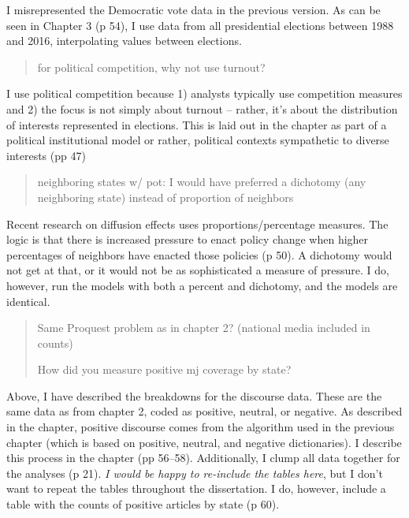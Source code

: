 \documentclass[12pt,stdletter,dateno,sigleft]{newlfm} %
\begin{document}
\begin{newlfm}
I misrepresented the Democratic vote data in the previous version. As can be seen in Chapter 3 (p 54), I use data from all presidential elections between 1988 and 2016, interpolating values between elections. 

\begin{quotation}{\color{red}\noindent \footnotesize
for political competition, why not use turnout?
}
\end{quotation}

I use political competition because 1) analysts typically use competition measures and 2) the focus is not simply about turnout -- rather, it's about the distribution of interests represented in elections. This is laid out in the chapter as part of a political institutional model or rather, political contexts sympathetic to diverse interests (pp 47) 



\begin{quotation}{\color{red}\noindent \footnotesize
neighboring states w/ pot: I would have preferred a dichotomy (any neighboring state) instead of proportion of neighbors
}
\end{quotation}

Recent research on diffusion effects uses proportions/percentage measures. The logic is that there is increased pressure to enact policy change when higher percentages of neighbors have enacted those policies (p 50). A dichotomy would not get at that, or it would not be as sophisticated a measure of pressure. I do, however, run the models with both a percent and dichotomy, and the models are identical. 


\begin{quotation}{\color{red}\noindent \footnotesize
Same Proquest problem as in chapter 2? (national media included in counts)\newline

\noindent How did you measure positive mj coverage by state?
}
\end{quotation}

Above, I have described the breakdowns for the discourse data. These are the same data as from chapter 2, coded as positive, neutral, or negative. As described in the chapter, positive discourse comes from the algorithm used in the previous chapter (which is based on positive, neutral, and negative dictionaries). I describe this process in the chapter (pp 56--58). Additionally, I clump all data together for the analyses (p 21). \textit{I would be happy to re-include the tables here}, but I don't want to repeat the tables throughout the dissertation. I do, however, include a table with the counts of positive articles by state (p 60).



\end{newlfm}
\end{document}

